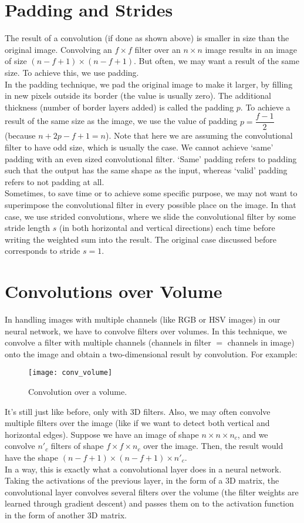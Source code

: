 \documentclass[a4paper, 12pt]{report}
\begin{document}
\section{Padding and Strides}
The result of a convolution (if done as shown above) is smaller in size than the original image. Convolving an $f\times f$ filter over an $n\times n$ image results in an image of size $(n-f+1) \times (n-f+1)$. But often, we may want a result of the same size. To achieve this, we use padding.\\
\break
In the padding technique, we pad the original image to make it larger, by filling in new pixels outside its border (the value is usually zero). The additional thickness (number of border layers added) is called the padding $p$. To achieve a result of the same size as the image, we use the value of padding $p=\dfrac{f-1}{2}$ (because $n+2p-f+1=n$). Note that here we are assuming the convolutional filter to have odd size, which is usually the case. We cannot achieve `same' padding with an even sized convolutional filter. `Same' padding refers to padding such that the output has the same shape as the input, whereas `valid' padding refers to not padding at all.\\
\break
Sometimes, to save time or to achieve some specific purpose, we may not want to superimpose the convolutional filter in every possible place on the image. In that case, we use strided convolutions, where we slide the convolutional filter by some stride length $s$ (in both horizontal and vertical directions) each time before writing the weighted sum into the result. The original case discussed before corresponds to stride $s=1$.

\section{Convolutions over Volume}
In handling images with multiple channels (like RGB or HSV images) in our neural network, we have to convolve filters over volumes. In this technique, we convolve a filter with multiple channels (channels in filter $=$ channels in image) onto the image and obtain a two-dimensional result by convolution. For example:
\begin{figure}[H]
\centering
\texttt{[image: conv\_volume]}
\caption{Convolution over a volume.}
\end{figure}
It's still just like before, only with 3D filters. Also, we may often convolve multiple filters over the image (like if we want to detect both vertical and horizontal edges). Suppose we have an image of shape $n\times n\times n_c$, and we convolve $n'_c$ filters of shape $f\times f\times n_c$ over the image. Then, the result would have the shape $(n-f+1)\times(n-f+1)\times n'_c$.\\
\break
In a way, this is exactly what a convolutional layer does in a neural network. Taking the activations of the previous layer, in the form of a 3D matrix, the convolutional layer convolves several filters over the volume (the filter weights are learned through gradient descent) and passes them on to the activation function in the form of another 3D matrix.
\end{document}
